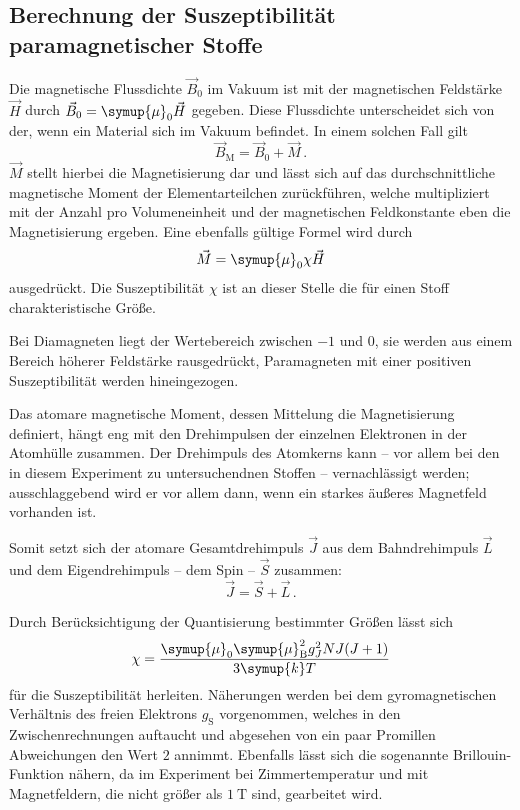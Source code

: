 \subsection{Berechnung der Suszeptibilität paramagnetischer Stoffe}

    Die magnetische Flussdichte $\vec{B}_0$ im Vakuum ist mit der magnetischen Feldstärke $\vec{H}$ durch ${\vec{B}_0=\symup{\mu}_0 \vec{H}}$
    gegeben. Diese Flussdichte unterscheidet sich von der, wenn ein Material sich im Vakuum befindet. 
    In einem solchen Fall gilt 
    \begin{equation}
        \vec{B}_\text{M}= \vec{B}_0 + \vec{M} \,.
        \label{eqn:Flussdichte}
    \end{equation}
    $\vec{M}$ stellt hierbei die Magnetisierung dar und lässt sich auf das durchschnittliche magnetische Moment der Elementarteilchen 
    zurückführen, welche multipliziert mit der Anzahl pro Volumeneinheit und der magnetischen Feldkonstante eben die Magnetisierung ergeben.
    Eine ebenfalls gültige Formel wird durch 
    \begin{equation*}
        \vec{M}=\symup{\mu}_0 \chi \vec{H}
    \end{equation*}
    ausgedrückt.
    Die Suszeptibilität $\chi$ ist an dieser Stelle die für einen Stoff charakteristische Größe. 

    Bei Diamagneten liegt der Wertebereich zwischen $-1$ und $0$, sie werden aus einem Bereich höherer Feldstärke rausgedrückt, 
    Paramagneten mit einer positiven Suszeptibilität werden hineingezogen. 

    Das atomare magnetische Moment, dessen Mittelung die Magnetisierung definiert, hängt eng mit den Drehimpulsen der einzelnen 
    Elektronen in der Atomhülle zusammen. 
    Der Drehimpuls des Atomkerns kann -- vor allem bei den in diesem Experiment zu untersuchendnen Stoffen -- vernachlässigt 
    werden; ausschlaggebend wird er vor allem dann, wenn ein starkes äußeres Magnetfeld vorhanden ist.

    Somit setzt sich der atomare Gesamtdrehimpuls $\vec{J}$ aus dem Bahndrehimpuls $\vec{L}$ und dem Eigendrehimpuls -- dem 
    Spin -- $\vec{S}$ zusammen:
    \begin{equation*}
        \vec{J}=\vec{S}+\vec{L} \,.
    \end{equation*}
    
    Durch Berücksichtigung der Quantisierung bestimmter Größen lässt sich 
    \begin{equation}   
        \chi = \frac{\symup{\mu}_0 \symup{\mu} _\text{B}^2 g_J^2 NJ(J+1)}{3\symup{k}T}
        \label{eqn:chii}
    \end{equation}
    für die Suszeptibilität herleiten\cite{Versuchsanleitung}. 
    Näherungen werden bei dem gyromagnetischen Verhältnis des freien Elektrons $g_\text{S}$ vorgenommen, welches in den Zwischenrechnungen auftaucht und 
    abgesehen von ein paar Promillen Abweichungen den Wert $2$ annimmt. 
    Ebenfalls lässt sich die sogenannte Brillouin-Funktion nähern, da im Experiment bei Zimmertemperatur und mit 
    Magnetfeldern, die nicht größer als $\SI{1}{\tesla}$ sind, gearbeitet wird.

